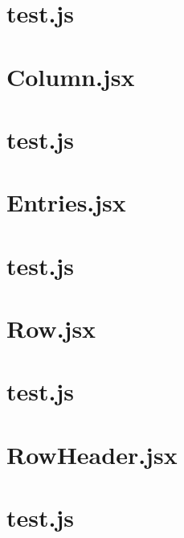 \documentclass[a4paper,landscape]{report}
\begin{document}
\newpage
\section{test.js}


\newpage
\section{Column.jsx}


\newpage
\section{test.js}


\newpage
\section{Entries.jsx}


\newpage
\section{test.js}


\newpage
\section{Row.jsx}


\newpage
\section{test.js}


\newpage
\section{RowHeader.jsx}


\newpage
\section{test.js}

\end{document}
